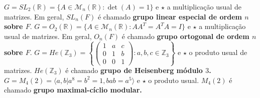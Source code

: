 \documentclass[12pt, a4paper]{article}
\newcommand{\negrito}[1]{\mbox{\boldmath{$#1$}}}
\begin{document}
\begin{tasks}[counter-format={(tsk[a])},label-width=3.6ex, label-format = {\bfseries}, column-sep = {0pt}]
\task[\textcolor{Floresta}{$\negrito{(h)} $}] $G = SL_2(\mathbb{R}) = \{ A \in \mathcal{M}_n(\mathbb{R}) : \det(A)= 1 \}$ e $\star$ a multiplicação usual de matrizes. Em geral, $SL_n(F)$ é chamado \textbf{grupo linear especial de ordem $n$ sobre $F.$}
\task[\textcolor{Floresta}{$\negrito{(i)} $}] $G = O_2(\mathbb{R}) = \{ A \in \mathcal{M}_n(\mathbb{R}) : AA^T = A^TA = I \}$ e $\star$ a multiplicação usual de matrizes. Em geral, $O_n(F)$ é chamado \textbf{grupo ortogonal de ordem $n$ sobre $F.$}
\task[\textcolor{Floresta}{$\negrito{(j)} $}] $G = He(\mathbb{Z}_3) = \left\{ \left( \begin{array}{ccc} 1 & a & c \\ 0 & 1 & b \\ 0 & 0 & 1 \end{array} \right) : a,b,c \in \mathbb{Z}_3 \right\}$ e $\star$ o produto usual de matrizes. $ He(\mathbb{Z}_3)$ é chamado \textbf{grupo de Heisenberg módulo $3$.}
\task[\textcolor{Floresta}{$\negrito{(k)} $}] $G = M_4(2) = \langle a,b | a^8 = b^2 = 1, bab = a^5 \rangle$ e $\star$ o produto usual. $ M_4(2)$ é chamado \textbf{grupo maximal-cíclio modular.}%
\end{tasks}
\end{document}
